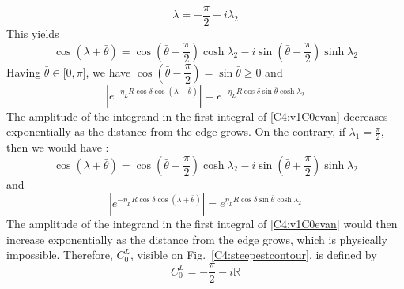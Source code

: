 \begin{equation}
\lambda=-\dfrac{\pi}{2}+i\lambda_2
\end{equation}
This yields
\begin{equation}
\cos(\lambda+\bar{\theta})=\cos(\bar{\theta}-\dfrac{\pi}{2})\cosh\lambda_2-i\sin(\bar{\theta}-\dfrac{\pi}{2})\sinh\lambda_2
\end{equation}
Having $\bar{\theta} \in \lbrack 0,\pi \rbrack$, we have $\cos(\bar{\theta}-\dfrac{\pi}{2})=\sin\bar{\theta}\geq 0$ and 
\begin{equation}
|e^{-\eta_L R\cos\delta\cos(\lambda+\bar{\theta})}|=e^{-\eta_L R\cos\delta\sin\bar{\theta}\cosh\lambda_2}
\end{equation}
The amplitude of the integrand in the first integral of \eqref{C4:v1C0evan} decreases exponentially as the distance from the edge grows. On the contrary, if $\lambda_1=\frac{\pi}{2}$, then we would have :
\begin{equation}
\cos(\lambda+\bar{\theta})=\cos(\bar{\theta}+\dfrac{\pi}{2})\cosh\lambda_2-i\sin(\bar{\theta}+\dfrac{\pi}{2})\sinh\lambda_2
\end{equation}
and
\begin{equation}
|e^{-\eta_L R\cos\delta\cos(\lambda+\bar{\theta})}|=e^{\eta_L R\cos\delta\sin\bar{\theta}\cosh\lambda_2}
\end{equation}
The amplitude of the integrand in the first integral of \eqref{C4:v1C0evan} would then increase exponentially as the distance from the edge grows, which is physically impossible. Therefore, $C_0^L$, visible on Fig.~\ref{C4:steepestcontour}, is defined by
\begin{equation}
C_0^L= -\dfrac{\pi}{2}-i\mathbb{R}
\end{equation}

